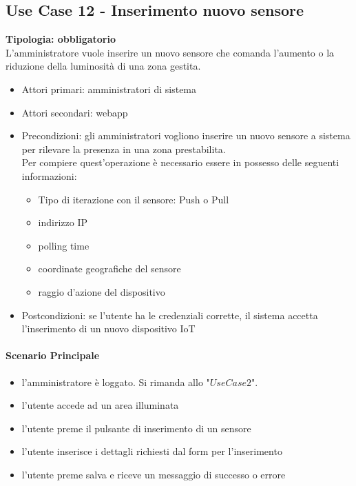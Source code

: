 \documentclass[12pt]{article}
\begin{document}
\subsection{Use Case 12 - Inserimento nuovo sensore}
\textbf{Tipologia: obbligatorio}\\
L'amministratore vuole inserire un nuovo sensore che comanda l'aumento o la riduzione della luminosità di una zona gestita.
\begin{itemize}
	\item Attori primari: amministratori di sistema
	\item Attori secondari: webapp
	\item Precondizioni: gli amministratori vogliono inserire un nuovo sensore a sistema per rilevare la presenza in una zona prestabilita.\\
	 Per compiere quest'operazione è necessario essere in possesso delle seguenti informazioni: 
	\begin{itemize}
		\item Tipo di iterazione con il sensore: Push o Pull
		\item indirizzo IP
		\item polling time
		\item coordinate geografiche del sensore
		\item raggio d'azione del dispositivo
	\end{itemize}
	\item Postcondizioni: se l'utente ha le credenziali corrette, il sistema accetta l'inserimento di un nuovo dispositivo IoT
\end{itemize}
\paragraph{Scenario Principale}
\begin{itemize}
	\item l'amministratore è loggato. Si rimanda allo "$Use Case 2$".
	\item l'utente accede ad un area illuminata
	\item l'utente preme il pulsante di inserimento di un sensore
	\item l'utente inserisce i dettagli richiesti dal form per l'inserimento
	\item l'utente preme salva e riceve un messaggio di successo o errore
\end{itemize}
\end{document}
